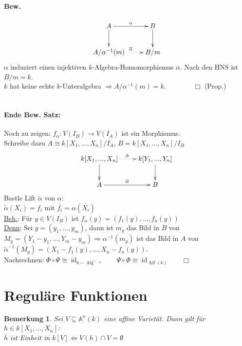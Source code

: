 \documentclass[a4paper,12pt]{report}
\theoremstyle{break}
\newtheorem{Bem}[Def]{Bemerkung}
\theoremstyle{nonumberbreak}
\theoremstyle{nonumberplain}
\begin{document}
\paragraph{Bew.}
\[
\begin{xy}
\xymatrix{
A\ar[r]^{\alpha}\ar[d]&B\ar[d] \\
A/\alpha^{-1}(m)\ar@{.>}[r]^{\overline{\alpha}}&B/m
}
\end{xy}
\]
$\alpha$ induziert einen injektiven $k$-Algebra-Homomorphismus $\overline{\alpha}$. Nach den HNS ist $B/m=k$.\\
$k$ hat keine echte $k$-Unteralgebra $\Rightarrow A/\alpha^{-1}(m)=k$.~~~~~~~~$\Box$ (Prop.)\\\\
\paragraph{Ende Bew. Satz:}
Noch zu zeigen: $f_{\alpha}: V(I_B) \rightarrow V(I_A)$ ist ein Morphismus.\\
Schreibe dazu $A\cong k[X_1,...,X_n]/I_A$, $B=k[X_1,...,X_n]/I_B$
\[
\begin{xy}
\xymatrix{
k[X_1,...,X_n]\ar@{.>}[r]^{\tilde{\alpha}}\ar[d]&k[Y_1,...,Y_n]\ar[d] \\
A\ar[r]^{\overline{\alpha}}&B
}
\end{xy}
\]
Bastle Lift $\tilde{\alpha}$ von $\alpha$:\\
$\tilde{\alpha}(X_i)=f_i$ mit $\overline{f_i}=\alpha(\overline{X_i})$\\
\underline{Beh.}: Für $y\in V(I_B)$ ist $f_{\alpha}(y)=(f_1(y),...,f_n(y))$\\
\underline{Denn}: Sei $y=(y_1,...,y_m)$, dann ist $m_y$ das Bild in $B$ von $M_y=(Y_1-y_1,...,Y_m-y_m)\Rightarrow \alpha^{-1}(m_y)$ ist das Bild in $A$ von $\tilde{\alpha}^{-1}(M_y)= (X_1-f_1(y),...,X_n-f_n(y))$.\\
Nachrechnen: $\Phi\circ\Psi\cong\operatorname{id}_{\underline{k-\operatorname{Alg}^{\circ}}}$, ~~~~$\Psi\circ\Phi\cong\operatorname{id}_{\underline{\operatorname{Aff}}(k)}~~~~~~~~\Box$

\section{Reguläre Funktionen}
\begin{Bem}
Sei $V\subseteq\mathbb{A}^n(k)$ eine affine Varietät. Dann gilt für $h\in k[X_1,...,X_n]$:\\
$\overline{h}$ ist Einheit in $k[V]\Leftrightarrow V(h)\cap V = \emptyset$
\end{Bem}
\end{document}
